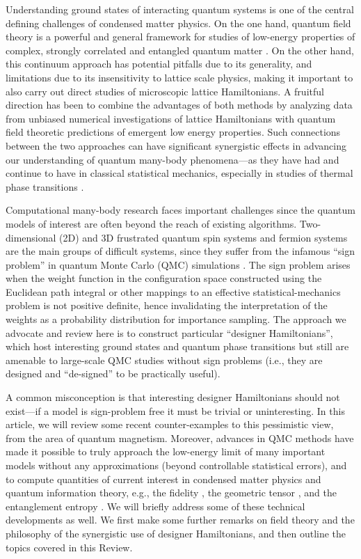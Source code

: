 \documentclass[10pt,pre,aps,twocolumn,showpacs,subscriptaddresses,floatfix]{revtex4}
\begin{document}
Understanding ground states of interacting quantum systems is one of the central defining challenges of condensed matter physics. On the one
hand, quantum field theory is a powerful and general framework for studies of low-energy properties of complex, strongly correlated and entangled 
quantum matter \cite{Sachdev11}. On the other hand, this continuum approach has potential pitfalls due to its generality, and limitations due to its 
insensitivity to lattice scale physics, making it important to also carry out direct studies of microscopic lattice Hamiltonians. A fruitful direction 
has been to combine the advantages of both methods by analyzing data from unbiased numerical investigations of lattice Hamiltonians with quantum field 
theoretic predictions of emergent low energy properties. Such connections between the two approaches can have significant synergistic effects in advancing 
our understanding of quantum many-body phenomena---as they have had and continue to have in classical statistical mechanics, especially in studies 
of thermal phase transitions \cite{cardy1988:fss,Chaikin00}. 

Computational many-body research faces important challenges since the quantum models of interest are often beyond the reach 
of existing algorithms. Two-dimensional (2D) and 3D frustrated quantum spin systems and fermion systems are the main groups 
of difficult systems, since they suffer from the infamous ``sign problem'' in quantum Monte Carlo (QMC) simulations
\cite{Loh90,Henelius00,Nyfeler08}. The sign problem arises when the weight function in the configuration space constructed using the Euclidean path 
integral or other mappings to an effective statistical-mechanics problem is not positive definite, hence invalidating the interpretation of the weights as a probability distribution for importance sampling. The approach we advocate and review here is to construct particular 
``designer Hamiltonians'', which host interesting ground states and quantum phase transitions but still are amenable to 
large-scale QMC studies without sign problems (i.e., they are designed and ``de-signed'' to be practically useful). 

A common misconception is that interesting designer Hamiltonians should not exist---if a model is sign-problem 
free it must be trivial or uninteresting. In this article, we will review some recent counter-examples to this pessimistic view, 
from the area of quantum magnetism. 
Moreover, advances in QMC 
methods \cite{Sandvik91,Evertz93,Beard96,WormA,Sandvik99,Sandvik10a} have made it possible to truly approach the 
low-energy limit of many important models without any approximations (beyond controllable statistical errors), and to compute 
quantities of current interest in condensed matter physics and quantum information theory, e.g., the fidelity 
\cite{Schwandt09}, the geometric tensor \cite{Degrandi11}, and the entanglement entropy \cite{Hastings10, Melko10}. We will 
briefly address some of these technical developments as well. We first make some further remarks on field theory and the philosophy 
of the synergistic use of designer Hamiltonians, and then outline the topics covered in this Review.
\end{document}
